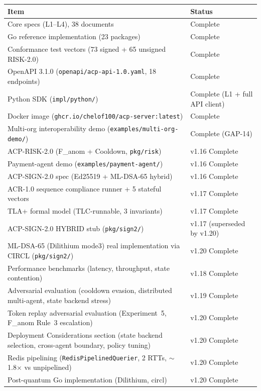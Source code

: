 \documentclass[11pt]{article}
\theoremstyle{definition}
\begin{document}
\begin{table}[h!]
\centering
\small
\begin{tabular}{@{}ll@{}}
\toprule
\textbf{Item} & \textbf{Status} \\
\midrule
Core specs (L1--L4), 38 documents & Complete \\
Go reference implementation (23 packages) & Complete \\
Conformance test vectors (73 signed + 65 unsigned RISK-2.0) & Complete \\
OpenAPI 3.1.0 (\texttt{openapi/acp-api-1.0.yaml}, 18 endpoints) & Complete \\
Python SDK (\texttt{impl/python/}) & Complete (L1 + full API client) \\
Docker image (\texttt{ghcr.io/chelof100/acp-server:latest}) & Complete \\
Multi-org interoperability demo (\texttt{examples/multi-org-demo/}) & Complete (GAP-14) \\
ACP-RISK-2.0 (F\_anom + Cooldown, \texttt{pkg/risk}) & v1.16 Complete \\
Payment-agent demo (\texttt{examples/payment-agent/}) & v1.16 Complete \\
ACP-SIGN-2.0 spec (Ed25519 + ML-DSA-65 hybrid) & v1.16 Complete \\
ACR-1.0 sequence compliance runner + 5 stateful vectors & v1.17 Complete \\
TLA+ formal model (TLC-runnable, 3 invariants) & v1.17 Complete \\
ACP-SIGN-2.0 HYBRID stub (\texttt{pkg/sign2/}) & v1.17 (superseded by v1.20) \\
ML-DSA-65 (Dilithium mode3) real implementation via CIRCL (\texttt{pkg/sign2/}) & v1.20 Complete \\
Performance benchmarks (latency, throughput, state contention) & v1.18 Complete \\
Adversarial evaluation (cooldown evasion, distributed multi-agent, state backend stress) & v1.19 Complete \\
Token replay adversarial evaluation (Experiment~5, F\_anom Rule~3 escalation) & v1.20 Complete \\
Deployment Considerations section (state backend selection, cross-agent boundary, policy tuning) & v1.20 Complete \\
Redis pipelining (\texttt{RedisPipelinedQuerier}, 2 RTTs, $\sim$1.8$\times$ vs unpipelined) & v1.20 Complete \\
Post-quantum Go implementation (Dilithium, circl) & v1.20 Complete \\

\end{tabular}
\end{table}
\end{document}
